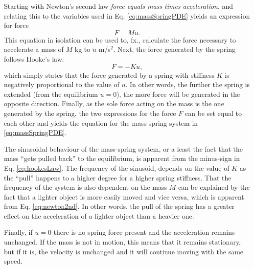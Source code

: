 Starting with Newton's second law \textit{force equals mass times acceleration}, and relating this to the variables used in Eq. \eqref{eq:massSpringPDE} yields an expression for force
\begin{equation}\label{eq:newton2nd}
    F = M\ddot u.
\end{equation}
This equation in isolation can be used to, fx., calculate the force necessary to accelerate a mass of $M$ kg to $\ddot u$ m/s$^2$. Next, the force generated by the spring follows Hooke's law:
\begin{equation}\label{eq:hookesLaw}
    F = -Ku,
\end{equation} 
which simply states that the force generated by a spring with stiffness $K$ is negatively proportional to the value of $u$. In other words, the further the spring is extended (from the equilibrium $u=0$), the more force will be generated in the opposite direction. Finally, as the sole force acting on the mass is the one generated by the spring, the two expressions for the force $F$ can be set equal to each other and yields the equation for the mass-spring system in \eqref{eq:massSpringPDE}. 

The sinusoidal behaviour of the mass-spring system, or a least the fact that the mass ``gets pulled back'' to the equilibrium, is apparent from the minus-sign in Eq. \eqref{eq:hookesLaw}. The frequency of the sinusoid, depends on the value of $K$ as the ``pull'' happens to a higher degree for a higher spring stiffness. 
That the frequency of the system is also dependent on the mass $M$ can be explained by the fact that a lighter object is more easily moved and vice versa, which is apparent from Eq. \eqref{eq:newton2nd}. In other words, the pull of the spring has a greater effect on the acceleration of a lighter object than a heavier one. 



Finally, if $u = 0$ there is no spring force present and the acceleration remains unchanged. If the mass is not in motion, this means that it remains stationary, but if it is, the velocity is unchanged and it will continue moving with the same speed. 

